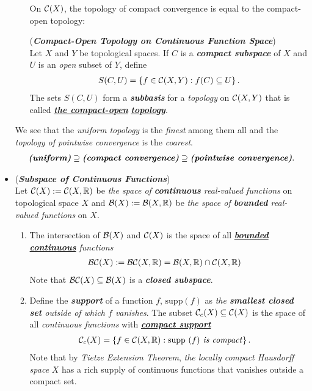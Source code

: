 \documentclass[11pt]{article}
\begin{document}
\begin{itemize}
\begin{remark}
\begin{enumerate}
On ${\mathcal C}(X)$, the topology of compact convergence is equal to the compact-open topology: 
 \begin{definition} (\emph{\textbf{Compact-Open Topology on Continuous Function Space}})\\
Let $X$ and $Y$ be topological spaces. If $C$ is a \emph{\textbf{compact subspace}} of $X$ and $U$ is an \emph{open} subset of $Y$, define
\begin{align*}
S(C,U) = \left\{ f \in {\mathcal C}(X, Y): f(C) \subseteq U\right\}.
\end{align*}
The sets $S(C, U)$ form a \emph{\textbf{subbasis}} for a \emph{topology} on ${\mathcal C}(X, Y)$ that is called \underline{\emph{\textbf{the compact-open}}} \underline{\emph{\textbf{topology}}}.
\end{definition}
\end{enumerate} 
We see that the \emph{uniform topology} is the \emph{finest} among them all and the \emph{topology of pointwise convergence} is the \emph{coarest}.
\begin{align*}
\text{\textbf{\emph{(uniform)}}} \supseteq \text{\textbf{\emph{(compact convergence)}}} \supseteq \text{\emph{\textbf{(pointwise convergence)}}}.
\end{align*}
\end{remark}


\item \begin{definition} (\emph{\textbf{Subspace of Continuous Functions}})\\
Let ${\mathcal C}(X) := {\mathcal C}(X, {\mathbb R})$ be \emph{the space of \textbf{continuous} real-valued functions} on topological space $X$ and ${\mathcal B}(X): = {\mathcal B}(X, {\mathbb R})$ be \emph{the space of \textbf{bounded} real-valued functions} on $X$.
\begin{enumerate}
\item The intersection of  ${\mathcal B}(X)$ and ${\mathcal C}(X)$ is the space of all \emph{\underline{\textbf{bounded continuous}} functions}
\begin{align*}
{\mathcal B}{\mathcal C}(X) := \mathcal{BC}(X, {\mathbb R}) &= {\mathcal B}(X, {\mathbb R}) \cap {\mathcal C}(X, {\mathbb R})
\end{align*} Note that $\mathcal{BC}(X) \subseteq {\mathcal B}(X)$ is a \emph{\textbf{closed subspace}}. 

\item Define the \emph{\textbf{support}} of a function $f$, $\text{supp}(f)$ as  \emph{the \textbf{smallest closed set} outside of which  $f$ vanishes}. The subset ${\mathcal C}_{c}(X) \subseteq {\mathcal C}(X)$ is the space of all \emph{continuous functions} with \underline{\emph{\textbf{compact support}}}
\begin{align*}
{\mathcal C}_{c}(X) &= \left\{f \in {\mathcal C}(X, {\mathbb R}): \text{supp }(f) \text{\emph{ is compact}}\right\}.
\end{align*} Note that by \emph{Tietze Extension Theorem}, \emph{the locally compact Hausdorff space} $X$ has a rich supply of continuous functions that vanishes outside a compact set.


\end{enumerate}
\end{definition}
\end{itemize}
\end{document}
